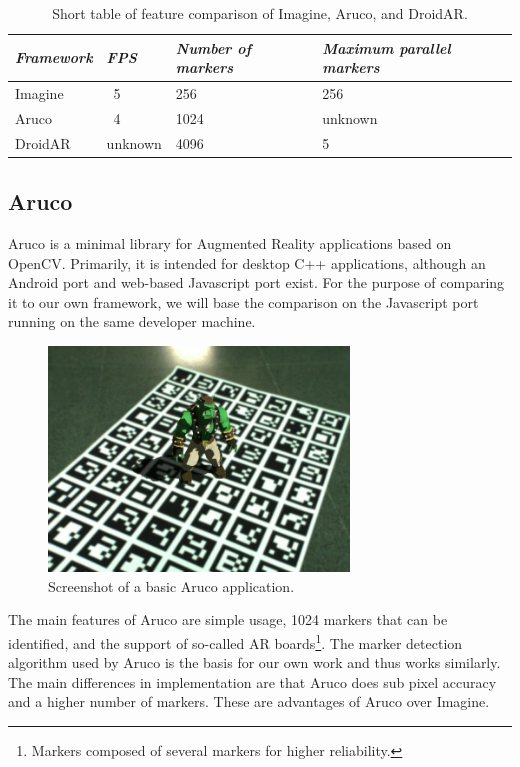 \begin{table}[H]
	\centering
	\begin{tabulary}{\textwidth}{J | J | J | J}
	\textit{Framework} & \textit{FPS} & \textit{Number of markers} & \textit{Maximum parallel markers} \\
	\hline
	Imagine & ~5 & 256 & 256 \\
	\hline
	Aruco & ~4 & 1024 & unknown \\
	\hline
	DroidAR & unknown & 4096 & 5 \\
	\end{tabulary}
	\caption[Performance Comparison]{Short table of feature comparison of Imagine, Aruco, and DroidAR.}
	\label{comp}
\end{table}

\subsection{Aruco}

Aruco \cite{aruco} is a minimal library for Augmented Reality applications based on OpenCV.
Primarily, it is intended for desktop C++ applications, although an Android port and web-based Javascript port exist.
For the purpose of comparing it to our own framework, we will base the comparison on the Javascript port \cite{jsaruco} running on the same developer machine.

\begin{figure}[H]
	\centering
	\includegraphics[width=8cm]{img/aruco.png}
	\caption[Aruco]{Screenshot of a basic Aruco application.}
	\label{fig:aruco}
\end{figure}

The main features of Aruco are simple usage, 1024 markers that can be identified, and the support of so-called AR boards\footnote{Markers composed of several markers for higher reliability.}.
The marker detection algorithm used by Aruco is the basis for our own work and thus works similarly.
The main differences in implementation are that Aruco does sub pixel accuracy and a higher number of markers.
These are advantages of Aruco over Imagine.

